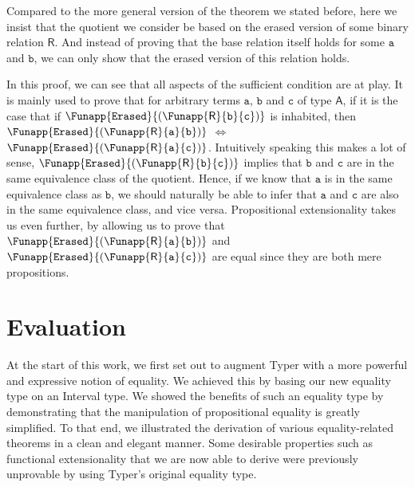 \documentclass[12pt,twoside,maitrise]{dms}
\theoremstyle{definition}
\numberwithin{equation}{section}
\numberwithin{table}{chapter}
\numberwithin{figure}{chapter}
\newcommand\kw[1] {\textsf{#1}}
\newcommand\id[1] {\texttt{#1}}
\begin{document}
Compared to the more general version of the theorem we stated before, here we
insist that the quotient we consider be based on the erased version of some
binary relation $\kw{R}$. And instead of proving that the base relation itself
holds for some $\id{a}$ and $\id{b}$, we can only show that the erased version
of this relation holds.

In this proof, we can see that all aspects of the sufficient condition are at
play. It is mainly used to prove that for arbitrary terms $\id{a}$, $\id{b}$ and
$\id{c}$ of type $\kw{A}$, if it is the case that if
$\Funapp{\id{Erased}}{(\Funapp{\kw{R}}{\id{b}}{\id{c}})}$ is inhabited, then
$\Funapp{\id{Erased}}{(\Funapp{\kw{R}}{\id{a}}{\id{b}})}$ $\iff$
$\Funapp{\id{Erased}}{(\Funapp{\kw{R}}{\id{a}}{\id{c}})}$. Intuitively speaking
this makes a lot of sense,
$\Funapp{\id{Erased}}{(\Funapp{\kw{R}}{\id{b}}{\id{c}})}$ implies that $\id{b}$
and $\id{c}$ are in the same equivalence class of the quotient. Hence, if we
know that $\id{a}$ is in the same equivalence class as $\id{b}$, we should
naturally be able to infer that $\id{a}$ and $\id{c}$ are also in the same
equivalence class, and vice versa. Propositional extensionality takes us even
further, by allowing us to prove that
$\Funapp{\id{Erased}}{(\Funapp{\kw{R}}{\id{a}}{\id{b}})}$ and
$\Funapp{\id{Erased}}{(\Funapp{\kw{R}}{\id{a}}{\id{c}})}$ are equal since they
are both mere propositions.

\chapter{Evaluation}\label{ch:evaluation}

At the start of this work, we first set out to augment Typer with a more
powerful and expressive notion of equality. We achieved this by basing our new
equality type on an Interval type. We showed the benefits of such an equality
type by demonstrating that the manipulation of propositional equality is greatly
simplified. To that end, we illustrated the derivation of various
equality-related theorems in a clean and elegant manner. Some desirable
properties such as functional extensionality that we are now able to derive were
previously unprovable by using Typer's original equality type.
\end{document}
